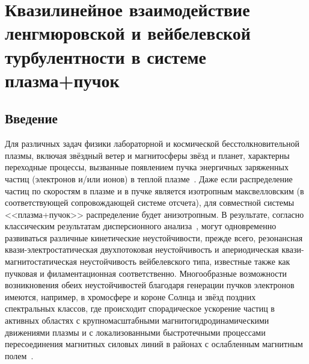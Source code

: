 \chapter{Квазилинейное взаимодействие ленгмюровской и вейбелевской турбулентности в системе плазма+пучок}
\label{ch:ch3}
\section{Введение}\label{sec:ch3/sec1}

Для различных задач физики лабораторной и космической бесстолкновительной плазмы, включая звёздный ветер и магнитосферы звёзд и планет, характерны переходные процессы, вызванные появлением пучка энергичных заряженных частиц (электронов и/или ионов) в теплой плазме~\cite{Gary1993,Treumann1997,Marsch2006,Aschwanden2005,Baumjohann2012,Marcowith2016,Lazar2023,Lui1993}. Даже если распределение частиц по скоростям в плазме и в пучке является изотропным максвелловским (в соответствующей сопровождающей системе отсчета), для совместной системы <<плазма+пучок>> распределение будет анизотропным. В результате, согласно классическим результатам дисперсионного анализа~\cite{Mikhailovsky1971,Krall1973,Fried1959,Tzoufras2006,Hao2008,Bret2010,Ruyer2015,Moya2022}, могут одновременно развиваться различные кинетические неустойчивости, прежде всего, резонансная квази-электростатическая двухпотоковая неустойчивость и апериодическая квази-магнитостатическая неустойчивость вейбелевского типа, известные также как пучковая и филаментационная соответственно. Многообразные возможности возникновения обеих неустойчивостей благодаря генерации пучков электронов имеются, например, в хромосфере и короне Солнца и звёзд поздних спектральных классов, где происходит спорадическое ускорение частиц в активных областях с крупномасштабными магнитогидродинамическими движениями плазмы и с локализованными быстротечными процессами пересоединения магнитных силовых линий в районах с ослабленным магнитным полем~\cite{Treumann2013,Che2014,Che2016,Krasnoselskikh2025,Dudik2017,Zaitsev2017,Nakamura2018,Srivastava2019}.

